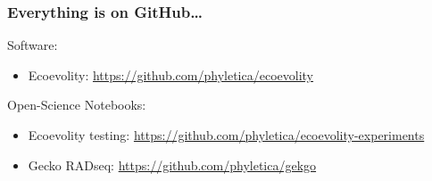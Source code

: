 % 
\begin{frame}
    \frametitle{Everything is on GitHub\ldots}
    Software:\\
    \begin{itemize}
        \item Ecoevolity:
            \url{https://github.com/phyletica/ecoevolity}
    \end{itemize}

    \medskip
    Open-Science Notebooks:\\
    \begin{itemize}
        \item Ecoevolity testing:
            \url{https://github.com/phyletica/ecoevolity-experiments}
        \item Gecko RADseq:
            \url{https://github.com/phyletica/gekgo}
    \end{itemize}
\end{frame}

